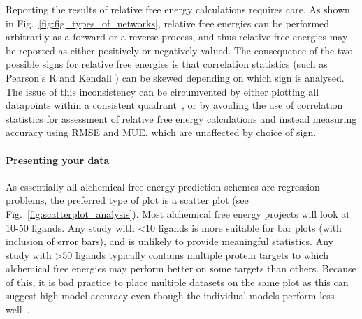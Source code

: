 \documentclass[9pt,bestpractices,pubversion]{livecoms}
\begin{document}
Reporting the results of relative free energy calculations requires care. As shown in Fig.~\ref{fig:fig_types_of_networks}, relative free energies can be performed arbitrarily as a forward or a reverse process, and thus relative free energies may be reported as either positively or negatively valued. The consequence of the two possible signs for relative free energies is that correlation statistics (such as Pearson's R and Kendall \texttau{}) can be skewed depending on which sign is analysed. The issue of this inconsistency can be circumvented by either plotting all datapoints within a consistent quadrant~\cite{perez-benito2019predicting}, or by avoiding the use of correlation statistics for assessment of relative free energy calculations and instead measuring accuracy using RMSE and MUE, which are unaffected by choice of sign.


\paragraph{Presenting your data}
As essentially all alchemical free energy prediction schemes are regression problems, the preferred type of plot is a scatter plot (see Fig.~\ref{fig:scatterplot_analysis}). Most alchemical free energy projects will look at 10-50 ligands. Any study with \textless10 ligands is more suitable for bar plots (with inclusion of error bars), and is unlikely to provide meaningful statistics. Any study with \textgreater50 ligands typically contains multiple protein targets to which alchemical free energies may perform better on some targets than others. Because of this, it is bad practice to place multiple datasets on the same plot as this can suggest high model accuracy even though the individual models perform less well~\cite{walterthoughts}.
\end{document}
